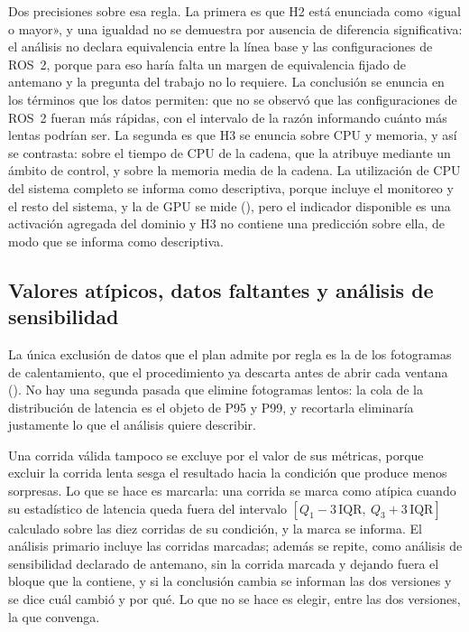 Dos precisiones sobre esa regla. La primera es que H2 está enunciada como
«igual o mayor», y una igualdad no se demuestra por ausencia de diferencia
significativa: el análisis no declara equivalencia entre la línea base y las
configuraciones de ROS~2, porque para eso haría falta un margen de equivalencia
fijado de antemano y la pregunta del trabajo no lo requiere. La conclusión se
enuncia en los términos que los datos permiten: que no se observó que las
configuraciones de ROS~2 fueran más rápidas, con el intervalo de la razón
informando cuánto más lentas podrían ser. La segunda es que H3 se enuncia sobre
CPU y memoria, y así se contrasta: sobre el tiempo de CPU de la cadena, que la
 atribuye mediante un ámbito de control, y sobre la
memoria media de la cadena. La utilización de CPU del sistema completo se
informa como descriptiva, porque incluye el monitoreo y el resto del sistema, y
la de GPU se mide
(), pero el indicador disponible es una
activación agregada del dominio y H3 no contiene una predicción sobre ella, de
modo que se informa como descriptiva.


\subsection{Valores atípicos, datos faltantes y análisis de sensibilidad}
\label{sec:analysis-outliers}

La única exclusión de datos que el plan admite por regla es la de los
fotogramas de calentamiento, que el procedimiento ya descarta antes de abrir
cada ventana (). No hay una segunda pasada que elimine
fotogramas lentos: la cola de la distribución de latencia es el objeto de P95 y
P99, y recortarla eliminaría justamente lo que el análisis quiere describir.

Una corrida válida tampoco se excluye por el valor de sus métricas, porque
excluir la corrida lenta sesga el resultado hacia la condición que produce
menos sorpresas. Lo que se hace es marcarla: una corrida se marca como atípica
cuando su estadístico de latencia queda fuera del intervalo
$[Q_1-3\,\mathrm{IQR},\ Q_3+3\,\mathrm{IQR}]$ calculado sobre las diez
corridas de su condición, y la marca se informa. El análisis primario incluye
las corridas marcadas; además se repite, como análisis de sensibilidad
declarado de antemano, sin la corrida marcada y dejando fuera el bloque que la
contiene, y si la conclusión cambia se informan las dos versiones y se dice
cuál cambió y por qué. Lo que no se hace es elegir, entre las dos versiones,
la que convenga.

